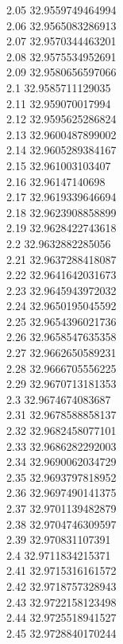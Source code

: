 {2.05	32.9559749464994\\
2.06	32.9565083286913\\
2.07	32.9570344463201\\
2.08	32.9575534952691\\
2.09	32.9580656597066\\
2.1	32.9585711129035\\
2.11	32.959070017994\\
2.12	32.9595625286824\\
2.13	32.9600487899002\\
2.14	32.9605289384167\\
2.15	32.961003103407\\
2.16	32.96147140698\\
2.17	32.9619339646694\\
2.18	32.9623908858899\\
2.19	32.9628422743618\\
2.2	32.9632882285056\\
2.21	32.9637288418087\\
2.22	32.9641642031673\\
2.23	32.9645943972032\\
2.24	32.9650195045592\\
2.25	32.9654396021736\\
2.26	32.9658547635358\\
2.27	32.9662650589231\\
2.28	32.9666705556225\\
2.29	32.9670713181353\\
2.3	32.9674674083687\\
2.31	32.9678588858137\\
2.32	32.9682458077101\\
2.33	32.9686282292003\\
2.34	32.9690062034729\\
2.35	32.9693797818952\\
2.36	32.9697490141375\\
2.37	32.9701139482879\\
2.38	32.9704746309597\\
2.39	32.970831107391\\
2.4	32.9711834215371\\
2.41	32.9715316161572\\
2.42	32.9718757328943\\
2.43	32.9722158123498\\
2.44	32.9725518941527\\
2.45	32.9728840170244\\
}
